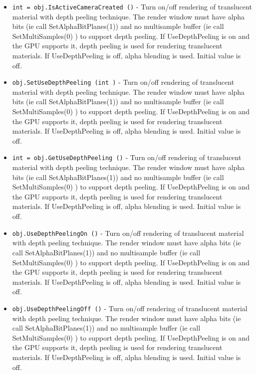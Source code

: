 \begin{itemize}
\item  \verb|int = obj.IsActiveCameraCreated ()| -  Turn on/off rendering of translucent material with depth peeling
 technique. The render window must have alpha bits (ie call
 SetAlphaBitPlanes(1)) and no multisample buffer (ie call
 SetMultiSamples(0) ) to support depth peeling.
 If UseDepthPeeling is on and the GPU supports it, depth peeling is used
 for rendering translucent materials.
 If UseDepthPeeling is off, alpha blending is used.
 Initial value is off.

\item  \verb|obj.SetUseDepthPeeling (int )| -  Turn on/off rendering of translucent material with depth peeling
 technique. The render window must have alpha bits (ie call
 SetAlphaBitPlanes(1)) and no multisample buffer (ie call
 SetMultiSamples(0) ) to support depth peeling.
 If UseDepthPeeling is on and the GPU supports it, depth peeling is used
 for rendering translucent materials.
 If UseDepthPeeling is off, alpha blending is used.
 Initial value is off.

\item  \verb|int = obj.GetUseDepthPeeling ()| -  Turn on/off rendering of translucent material with depth peeling
 technique. The render window must have alpha bits (ie call
 SetAlphaBitPlanes(1)) and no multisample buffer (ie call
 SetMultiSamples(0) ) to support depth peeling.
 If UseDepthPeeling is on and the GPU supports it, depth peeling is used
 for rendering translucent materials.
 If UseDepthPeeling is off, alpha blending is used.
 Initial value is off.

\item  \verb|obj.UseDepthPeelingOn ()| -  Turn on/off rendering of translucent material with depth peeling
 technique. The render window must have alpha bits (ie call
 SetAlphaBitPlanes(1)) and no multisample buffer (ie call
 SetMultiSamples(0) ) to support depth peeling.
 If UseDepthPeeling is on and the GPU supports it, depth peeling is used
 for rendering translucent materials.
 If UseDepthPeeling is off, alpha blending is used.
 Initial value is off.

\item  \verb|obj.UseDepthPeelingOff ()| -  Turn on/off rendering of translucent material with depth peeling
 technique. The render window must have alpha bits (ie call
 SetAlphaBitPlanes(1)) and no multisample buffer (ie call
 SetMultiSamples(0) ) to support depth peeling.
 If UseDepthPeeling is on and the GPU supports it, depth peeling is used
 for rendering translucent materials.
 If UseDepthPeeling is off, alpha blending is used.
 Initial value is off.


\end{itemize}
